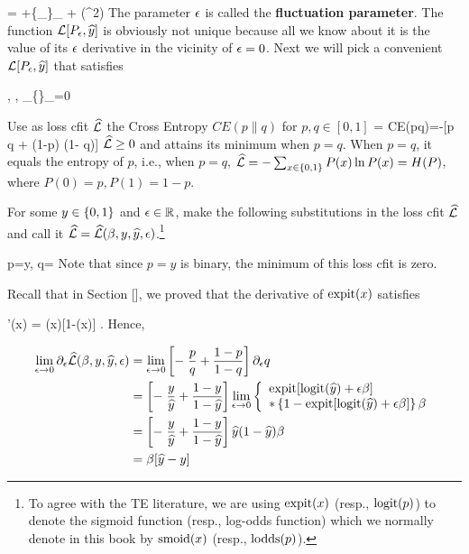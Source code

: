 \beq
{} = \call[P_0, \haty]
+\eps \{\partial_\eps {}\}_{} + \calo(\eps^2)
\eeq
The parameter $\epsilon$ is called the {\bf fluctuation parameter}.
The function ${\cal L}[P_\epsilon, {\widehat{y}}]$ is obviously
not unique because all we know about it
is the value of its $\epsilon$ derivative
in the vicinity of $\epsilon=0$. Next we will pick a convenient
${\cal L}[P_\epsilon, {\widehat{y}}]$ that satisfies

\beq
{},\quad
{}, \quad \partial_\eps \{\}_{}=0
\eeq


Use as loss cfit $\widehat{{\cal L}}$ the Cross Entropy
$CE(p\parallel q)$ for $p, q\in [0,1]$
\beq
\hatl = CE(p\parallel q)=-[p \ln q + (1-p) \ln(1- q)]
\eeq
$\widehat{{\cal L}}\geq 0$ and attains its minimum when $p=q$.
When $p=q$, it equals the entropy of $p$,
i.e., when $p=q$, $\widehat{{\cal L}}=-\sum_{x\in \{0,1\}} P(x)\ln P(x)= H(P)$,
where $P(0)=p, P(1)=1-p$.

For some $y\in\{0,1\}$ and $\epsilon\in{ \mathbb{R}}$,
make the following
substitutions
in the loss cfit $\widehat{{\cal L}}$
and call it $\widehat{{\cal L}}=\widehat{{\cal L}}(\beta, y, {\widehat{y}}, \epsilon)$.\footnote{To
agree with the TE literature,
we are using ${\rm expit}(x)$
(resp., ${\rm logit}(p)$) to denote
the sigmoid function (resp., log-odds function)
which we normally
denote in this book by
 ${\rm smoid}(x)$ (resp., ${\rm lodds}(p)$).}

\beq
p=y,
\quad
q= \expit[\logit(\haty) + \eps \beta ]
\eeq
Note that since $p=y$ is binary,
the minimum of this loss cfit is zero.


 Recall that in Section [], we proved that
 the derivative of ${\rm expit}(x)$ satisfies

\beq
\expit'(x) = \expit(x)[1-\expit(x)]
\;.
\eeq
Hence,

\begin{align}
\lim_{\epsilon\rightarrow 0}\partial_\epsilon \widehat{{\cal L}}(\beta, y, {\widehat{y}}, \epsilon)
&=
\lim_{\epsilon\rightarrow 0}
\left[-\;\frac{p}{q} + \frac{1-p}{1-q}\right]\partial_\epsilon q
\\
&=
\left[-\;\frac{y}{{\widehat{y}}} + \frac{1-y}{1-{\widehat{y}}}\right]
\lim_{\epsilon\rightarrow 0}
\left\{
\begin{array}{l}
{\rm expit}[{\rm logit}({\widehat{y}}) + \epsilon \beta ]
\\
*\left\{1-{\rm expit}[{\rm logit}({\widehat{y}}) + \epsilon \beta ]\right\}
\beta
\end{array}
\right.
\\
&=
\left[-\;\frac{y}{{\widehat{y}}} + \frac{1-y}{1-{\widehat{y}}}\right]
{\widehat{y}}(1-{\widehat{y}})\beta
\\
&=
\beta[{\widehat{y}}-y]
\end{align}

